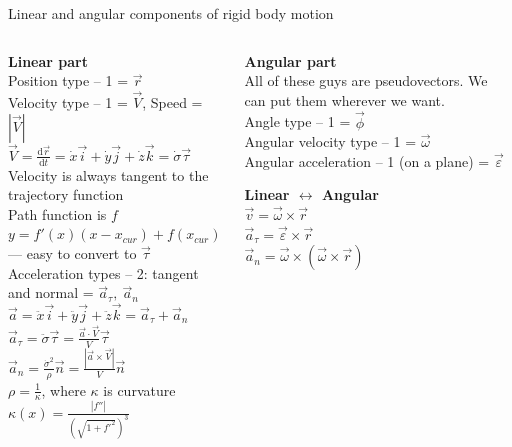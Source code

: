 \documentclass[aspectratio=169,xcolor=table,10pt, notes=hide]{beamer}
\begin{document}
\begin{frame}[t]{Linear and angular components of rigid body motion}
    \footnotesize
    \begin{columns}[T,onlytextwidth]
        \begin{column}{0.49\textwidth}
            \textbf{Linear part} \\
            Position type -- 1 = $\vec{r}$ \\
            Velocity type -- 1 = $\vec{V}$, Speed =  $|\vec{V}|$ \\
            $\vec{V} = \frac{\mathrm{d} \vec{r}}{\mathrm{d} t} = \dot{x}\vec{i} + \dot{y}\vec{j} + \dot{z}\vec{k} = \dot{\sigma}\vec{\tau} $ \\
            Velocity is always tangent to the trajectory function \\
            Path function is $f$ \\
            $y = f'(x)(x-x_{cur})+f(x_{cur})$ --- easy to convert to $\vec{\tau}$ \\
            Acceleration types -- 2: tangent and normal = $\vec{a}_{\tau},\ \vec{a}_{n}$ \\
            $\vec{a} = \ddot{x}\vec{i} + \ddot{y}\vec{j} + \ddot{z}\vec{k} = \vec{a}_{\tau} + \vec{a}_{n} $\\
            $\vec{a}_{\tau} = \ddot{\sigma} \vec{\tau} = \frac{\vec{a} \cdot \vec{V}}{V} \vec{\tau}$ \\
            $\vec{a}_{n} = \frac{\dot{\sigma}^2}{\rho}\vec{n} =\frac{|\vec{a} \times \vec{V}|}{V}\vec{n}$\\
            $\rho = \frac{1}{\kappa}$, where $\kappa$ is curvature \\
            $\kappa (x)=\frac {|f''|}{({\sqrt {1+f'^{2}}})^{3}}$
        \end{column}
        \begin{column}{0.49\textwidth}
            \textbf{Angular part} \\
            All of these guys are pseudovectors. We can put them wherever we want.\\
            Angle type -- 1 = $\vec{\phi}$\\
            Angular velocity type -- 1 = $\vec{\omega}$\\
            Angular acceleration -- 1 (on a plane) = $ \vec{\varepsilon}$

            \bigskip

            \textbf{Linear $\leftrightarrow$ Angular} \\
            $ \vec{v} = \vec{\omega} \times \vec{r}$ \\
            $ \vec{a}_{\tau} = \vec{\varepsilon} \times \vec{r}$ \\
            $ \vec{a}_{n} = \vec{\omega} \times (\vec{\omega} \times \vec{r})$
        \end{column}
    \end{columns}

\end{frame}
\end{document}
